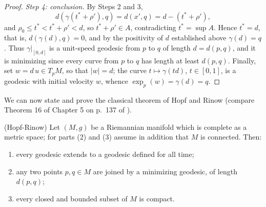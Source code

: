 \begin{proof}
\emph{Step 4: conclusion.} By Steps 2 and 3,
$$d\left(\gamma(t^*+\rho'),q\right)=d(x',q)=d-(t^*+\rho'),$$
and $\rho_0\le t^*<t^*+\rho'<d$, so $t^*+\rho'\in A$,
contradicting $t^*=\sup A$. Hence $t^*=d$, that is,
$d(\gamma(d),q)=0$, and by the positivity of $d$ established above
$\gamma(d)=q$. Thus $\gamma|_{[0,d]}$ is a unit-speed geodesic
from $p$ to $q$ of length $d=d(p,q)$, and it is minimizing since
every curve from $p$ to $q$ has length at least $d(p,q)$. Finally,
set $w=d\,u\in T_pM$, so that $|w|=d$; the curve
$t\mapsto\gamma(td)$, $t\in[0,1]$, is a geodesic with initial
velocity $w$, whence $\exp_p(w)=\gamma(d)=q$.
\end{proof}

We can now state and prove the classical theorem of Hopf and Rinow
(compare Theorem 16 of Chapter 5 on p.~137 of \cite{Petersen}).

\begin{theorem}
\label{thm:hopf-rinow}
(Hopf-Rinow) Let $(M,g)$ be a Riemannian manifold which is
complete as a metric space; for parts (2) and (3) assume in
addition that $M$ is connected. Then:
\begin{enumerate}
\item every geodesic extends to a geodesic defined for all time;
\item any two points $p,q\in M$ are joined by a minimizing
geodesic, of length $d(p,q)$;
\item every closed and bounded subset of $M$ is compact.
\end{enumerate}
\end{theorem}

